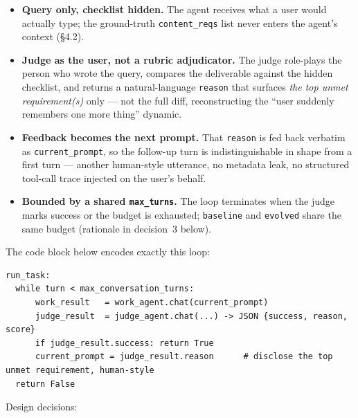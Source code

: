 \documentclass{article}
\begin{document}
\begin{itemize}
\item \textbf{Query only, checklist hidden.} The agent receives what a user would actually type; the ground-truth \texttt{content\_reqs} list never enters the agent's context (\S4.2).
\item \textbf{Judge as the user, not a rubric adjudicator.} The judge role-plays the person who wrote the query, compares the deliverable against the hidden checklist, and returns a natural-language \texttt{reason} that surfaces \emph{the top unmet requirement(s)} only --- not the full diff, reconstructing the ``user suddenly remembers one more thing'' dynamic.
\item \textbf{Feedback becomes the next prompt.} That \texttt{reason} is fed back verbatim as \texttt{current\_prompt}, so the follow-up turn is indistinguishable in shape from a first turn --- another human-style utterance, no metadata leak, no structured tool-call trace injected on the user's behalf.
\item \textbf{Bounded by a shared \texttt{max\_turns}.} The loop terminates when the judge marks success or the budget is exhausted; \texttt{baseline} and \texttt{evolved} share the same budget (rationale in decision~3 below).
\end{itemize}

The code block below encodes exactly this loop:

\begin{lstlisting}
run_task:
  while turn < max_conversation_turns:
      work_result   = work_agent.chat(current_prompt)
      judge_result  = judge_agent.chat(...) -> JSON {success, reason, score}
      if judge_result.success: return True
      current_prompt = judge_result.reason      # disclose the top unmet requirement, human-style
  return False
\end{lstlisting}

Design decisions:
\end{document}
